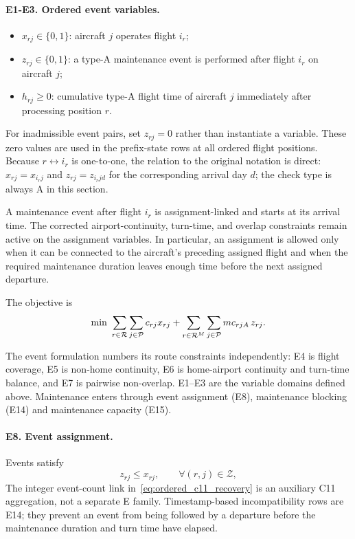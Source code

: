 \paragraph{E1-E3. Ordered event variables.}
\begin{itemize}
\item $x_{rj}\in\{0,1\}$: aircraft $j$ operates flight $i_r$;
\item $z_{rj}\in\{0,1\}$: a type-A maintenance event is performed after flight $i_r$ on aircraft $j$;
\item $h_{rj}\ge 0$: cumulative type-A flight time of aircraft $j$ immediately after processing position $r$.
\end{itemize}
For inadmissible event pairs, set $z_{rj}=0$ rather than instantiate a
variable. These zero values are used in the prefix-state rows at all
ordered flight positions.
Because $r\leftrightarrow i_r$ is one-to-one, the relation to the original
notation is direct: $x_{rj}=x_{i_r j}$ and $z_{rj}=z_{i_r jd}$ for the
corresponding arrival day $d$; the check type is always A in this section.

A maintenance event after flight $i_r$ is assignment-linked and starts at its
arrival time. The corrected airport-continuity, turn-time, and overlap constraints remain
active on the assignment variables. In particular, an assignment is allowed
only when it can be connected to the aircraft's preceding assigned flight and
when the required maintenance duration leaves enough time before the next
assigned departure.

The objective is
\begin{equation}
\min\ \sum_{r\in\mathcal{R}}\sum_{j\in\Pc}c_{rj}x_{rj}
 +\sum_{r\in\mathcal{R}^M}\sum_{j\in\Pc}mc_{rjA}\,z_{rj}.
\label{eq:ordered_event_objective}
\end{equation}

The event formulation numbers its route constraints independently: E4 is flight
coverage, E5 is non-home continuity, E6 is home-airport continuity and
turn-time balance, and E7 is pairwise non-overlap. E1--E3 are the variable
domains defined above. Maintenance enters through event assignment (E8),
maintenance blocking (E14) and maintenance capacity (E15).

\paragraph{E8. Event assignment.}
Events satisfy
\begin{equation}
z_{rj}\le x_{rj},
\qquad \forall (r,j)\in\mathcal{Z},
\label{eq:ordered_event_assignment}
\end{equation}
The integer event-count link in~\eqref{eq:ordered_c11_recovery} is an auxiliary C11
aggregation, not a separate E family. Timestamp-based incompatibility rows are E14;
they prevent an event from being followed by a departure before the
maintenance duration and turn time have elapsed.


